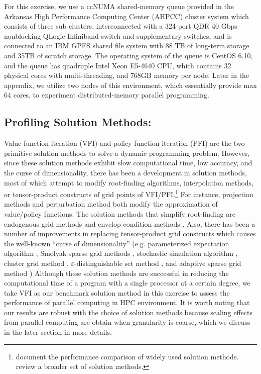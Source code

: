\documentclass[12pt]{article}
\begin{document}
For this exercise, we use a ccNUMA shared-memory queue provided in the Arkansas High Performance Computing Center (AHPCC) cluster system which consists of three sub clusters, interconnected with a 324-port QDR 40 Gbps nonblocking QLogic Infiniband switch and supplementary switches, and is connected to an IBM GPFS shared file system with 88 TB of long-term storage and 35TB of scratch storage. The operating system of the queue is CentOS 6.10, and the queue has quadruple Intel Xeon E5-4640 CPU, which contains 32 physical cores with multi-threading, and 768GB memory per node. Later in the appendix, we utilize two nodes of this environment, which essentially provide max 64 cores, to experiment distributed-memory parallel programming.


\subsection{Profiling Solution Methods:}
Value function iteration (VFI) and policy function iteration (PFI) are the two primitive solution methods to solve a dynamic programming problem. However, since these solution methods exhibit slow computational time, low accuracy, and the curse of dimensionality, there has been a development in solution methods, most of which attempt to modify root-finding algorithms, interpolation methods, or tensor-product constructs of grid points of VFI/PFI.\footnote{\sf \cite{Aruoba-Fernandez-Villaverde-Rubio-Ramirez-06} document the performance comparison of widely used solution methods. \cite{Maliar-Maliar-14} review a broader set of solution methods.}  For instance, projection methods \citep{Judd-92} and perturbation method \citep{Judd-Guu-93} both modify the approximation of value/policy functions. The solution methods that simplify root-finding are endogenous grid methods \citep{Carroll-05, Barillas-Fernandez-Villaverde-07} and envelop condition methods \citep{Maliar-Maliar-13b}. Also, there has been a number of improvements in replacing tensor-product grid constructs which causes the well-known ``curse of dimensionality'' (e.g. parameterized expectation algorithm \citep{Marcet-88,Den-Haan-Marcet-90}, Smolyak sparse grid methods \citep{Krueger-Kubler-04,Judd-Maliar-Maliar-Valero-14}, stochastic simulation algorithm \citep{Judd-Maliar-Maliar-11}, cluster grid method \citep{Judd-Maliar-Maliar-10}, $\varepsilon$-distinguishable set method \citep{Judd-Maliar-Maliar-12}, and adaptive sparse grid method \citep{Brumm-Scheidegger-17}) Although these solution methods are successful in reducing the computational time of a program with a single processor at a certain degree, we take VFI as our benchmark solution method in this exercise to assess the performance of parallel computing in HPC environment. It is worth noting that our results are robust with the choice of solution methods because scaling effects from parallel computing are obtain when granularity is coarse, which we discuss in the later section in more details.
\end{document}
